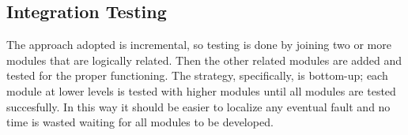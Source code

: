 \documentclass[../DD.tex]{subfiles}
\begin{document}
\subsection{Integration Testing\label{5.4.2}}

The approach adopted is incremental, so testing is done by joining two or more modules that are logically related. Then the other related modules are added and tested for the proper functioning. The strategy, specifically, is bottom-up; each module at lower levels is tested with higher modules until all modules are tested succesfully. In this way it should be easier to localize any eventual fault and no time is wasted waiting for all modules to be developed.
\end{document}
